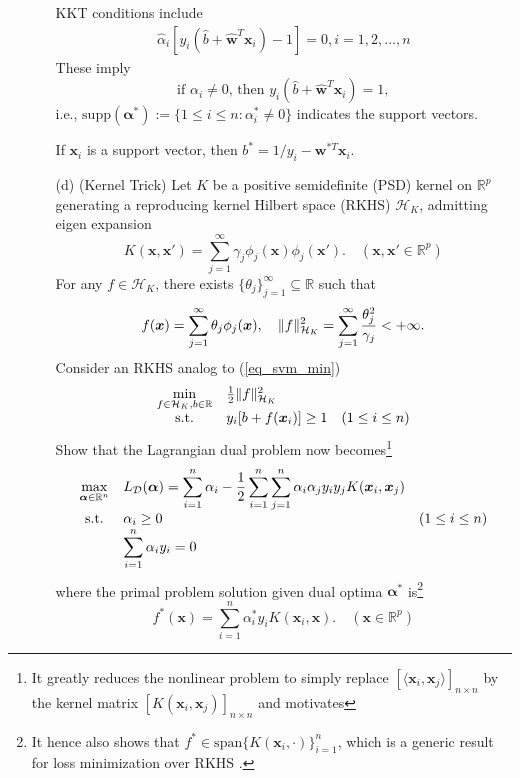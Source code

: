 \documentclass[10pt]{article}
\theoremstyle{definition}
\theoremstyle{remark}
\newcommand{\bw}{\bm{w}}
\newcommand{\bx}{\bm{x}}
\newcommand{\balpha}{\bm{\alpha}}
\newcommand{\bbR}{\mathbb{R}}
\newcommand{\cD}{\mathcal{D}}
\newcommand{\cH}{\mathcal{H}}
\newcommand{\rspan}{\mathrm{span}}	%
\newcommand{\supp}{\mathrm{supp}}	%
\newcommand{\st}{\mathrm{s.t.}}		%
\begin{document}
\begin{enumerate}
\begin{itemize}
		KKT conditions include
		\begin{align*}
		    \hat{\alpha}_i[y_{i}(\hat{b} + \hat{\bw}^{T}\bx_{i}) - 1] = 0, i=1,2,...,n
		\end{align*}
		These imply 
		\[\text{if~} \alpha_i \ne 0 \text{,~then~} y_{i}(\hat{b} + \hat{\bw}^{T}\bx_{i}) = 1, \]
		i.e., $ \supp(\balpha^{*}) := \{ 1 \le i \le n: \alpha^{*}_{i} \ne 0 \} $ indicates the support vectors.
		
		If $\bx_i$ is a support vector, then $b^* = 1/y_{i}-\bw^{*T}\bx_{i}$.
		
		\item [(d)] (Kernel Trick) Let $ K $ be a positive semidefinite (PSD) kernel on $ \bbR^{p} $ generating a reproducing kernel Hilbert space (RKHS) $ \cH_{K} $, admitting eigen expansion
		\[ K(\bx,\bx') = \sum_{j=1}^{\infty}\gamma_{j}\phi_{j}(\bx)\phi_{j}(\bx'). \quad(\bx,\bx' \in \bbR^{p}) \]
		For any $ f \in \cH_{K} $, there exists $ \{ \theta_{j} \}_{j=1}^{\infty} \subseteq \bbR $ such that
		\[ f(\bx) = \sum_{j=1}^{\infty}\theta_{j}\phi_{j}(\bx), \quad \|f\|^{2}_{\cH_{K}} = \sum_{j=1}^{\infty}{\theta_{j}^{2} \over \gamma_{j}} < +\infty. \]
		Consider an RKHS analog to (\ref{eq_svm_min})
		\begin{align}
		\begin{array}{cll}
		\min\limits_{f \in \cH_{K}, b \in \bbR} & {1 \over 2}\|f\|_{\cH_{K}}^{2}\\
		\st & y_{i}[b + f(\bx_{i})] \ge 1 & (1 \le i \le n)
		\end{array}\label{eq_svm_kern}
		\end{align}
		Show that the Lagrangian dual problem now becomes\footnote{It greatly reduces the nonlinear problem to simply replace $ [\langle \bx_{i},\bx_{j} \rangle]_{n\times n} $ by the kernel matrix $ [K(\bx_{i},\bx_{j})]_{n \times n} $ and motivates}
		\begin{align}
		\begin{array}{cll}
		\max\limits_{\balpha \in \bbR^{n}} & \displaystyle L_{\cD}(\balpha) = \sum_{i=1}^{n}\alpha_{i} - {1 \over 2}\sum_{i=1}^{n}\sum_{j=1}^{n}\alpha_{i}\alpha_{j}y_{i}y_{j}K(\bx_{i},\bx_{j}) \\
		\st & \alpha_{i} \ge 0 & (1 \le i \le n)\\
		& \displaystyle \sum_{i=1}^{n}\alpha_{i}y_{i} = 0
		\end{array}\label{eq_svm_kern_dual}
		\end{align}
		where the primal problem solution given dual optima $ \balpha^{*} $ is\footnote{It hence also shows that $ f^{*} \in \rspan\{ K(\bx_{i},\cdot) \}_{i=1}^{n} $, which is a generic result for loss minimization over RKHS \citep[Ex 5.15]{wahba1990spline, friedman2009elements}.}
		\[ f^{*}(\bx) = \sum_{i=1}^{n}\alpha_{i}^{*}y_{i}K(\bx_{i},\bx). \quad(\bx \in \bbR^{p}) \]
		

\end{itemize}
\end{enumerate}
\end{document}
